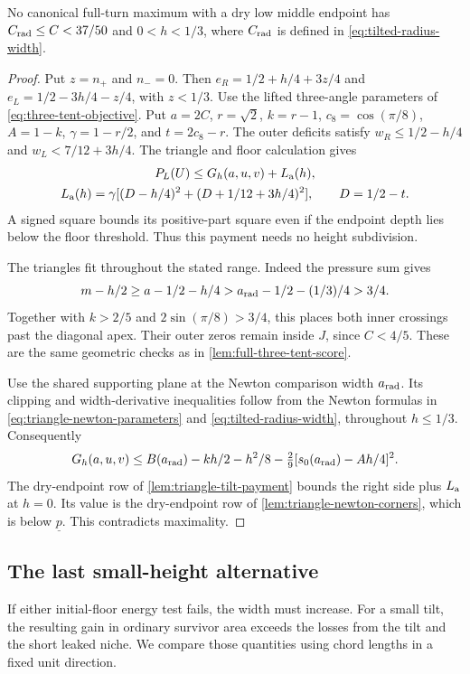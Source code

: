 \begin{lemma}\label{lem:tilted-medium-width}
No canonical full-turn maximum with a dry low middle endpoint has
\(C_{\rm rad}\le C<37/50\) and \(0<h<1/3\), where
\(C_{\rm rad}\) is defined in \eqref{eq:tilted-radius-width}.
\end{lemma}
\begin{proof}
Put \(z=n_+\) and \(n_-=0\). Then
\(e_R=1/2+h/4+3z/4\) and \(e_L=1/2-3h/4-z/4\), with \(z<1/3\).
Use the lifted three-angle parameters of
\eqref{eq:three-tent-objective}. Put \(a=2C\), \(r=\sqrt2\),
\(k=r-1\), \(c_8=\cos(\pi/8)\), \(A=1-k\),
\(\gamma=1-r/2\), and \(t=2c_8-r\).
The outer deficits satisfy
\(w_R\le1/2-h/4\) and \(w_L<7/12+3h/4\).
The triangle and floor calculation gives
\[
\begin{gathered}
P_L(U)\le G_h(a,u,v)+L_{\rm a}(h),\\
L_{\rm a}(h)=\gamma[(D-h/4)^2+(D+1/12+3h/4)^2],\qquad D=1/2-t.
\end{gathered}
\]
A signed square bounds its positive-part square even if the endpoint
depth lies below the floor threshold. Thus this payment needs no
height subdivision.

The triangles fit throughout the stated range. Indeed the pressure sum
gives
\[
m-h/2\ge a-1/2-h/4
> a_{\rm rad}-1/2-(1/3)/4>3/4.
\]
Together with \(k>2/5\) and \(2\sin(\pi/8)>3/4\), this places both
inner crossings past the diagonal apex. Their outer zeros remain
inside \(J\), since \(C<4/5\). These are the same geometric
checks as in \cref{lem:full-three-tent-score}.

Use the shared supporting plane at the Newton comparison width
\(a_{\rm rad}\). Its clipping and width-derivative inequalities follow
from the Newton formulas in \eqref{eq:triangle-newton-parameters}
and \eqref{eq:tilted-radius-width}, throughout \(h\le1/3\).
Consequently
\[
G_h(a,u,v)\le B(a_{\rm rad})-kh/2-h^2/8
 -\tfrac29[s_0(a_{\rm rad})-Ah/4]^2.
\]
The dry-endpoint row of \cref{lem:triangle-tilt-payment} bounds the
right side plus \(L_{\rm a}\) at \(h=0\).
Its value is the dry-endpoint row of \cref{lem:triangle-newton-corners},
which is below \(\underline p\). This contradicts maximality.
\end{proof}

\subsection{The last small-height alternative}

If either initial-floor energy test fails, the width must increase.
For a small tilt, the resulting gain in ordinary survivor area exceeds
the losses from the tilt and the short leaked niche. We compare those
quantities using chord lengths in a fixed unit direction.

